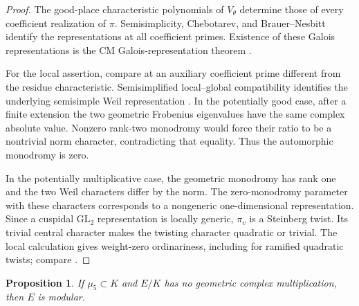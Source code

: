 \documentclass[11pt,a4paper]{article}
\newtheorem{proposition}[theorem]{Proposition}
\numberwithin{equation}{section}
\begin{document}
\begin{proof}
The good-place characteristic polynomials of \(V_\theta\) determine those of every coefficient realization of \(\pi\). Semisimplicity, Chebotarev, and Brauer--Nesbitt identify the representations at all coefficient primes. Existence of these Galois representations is the CM Galois-representation theorem \cite{HLTT}.

For the local assertion, compare at an auxiliary coefficient prime different from the residue characteristic. Semisimplified local--global compatibility identifies the underlying semisimple Weil representation \cite{V}. In the potentially good case, after a finite extension the two geometric Frobenius eigenvalues have the same complex absolute value. Nonzero rank-two monodromy would force their ratio to be a nontrivial norm character, contradicting that equality. Thus the automorphic monodromy is zero.

In the potentially multiplicative case, the geometric monodromy has rank one and the two Weil characters differ by the norm. The zero-monodromy parameter with these characters corresponds to a nongeneric one-dimensional representation. Since a cuspidal \(\mathrm{GL}_2\) representation is locally generic, \(\pi_v\) is a Steinberg twist. Its trivial central character makes the twisting character quadratic or trivial. The local calculation \cite[Lemma~9.2(ii)]{O} gives weight-zero ordinariness, including for ramified quadratic twists; compare \cite[Lemma~6.1.3(4)]{CN}.
\end{proof}

\begin{proposition}\label{prop:6.2}
If \(\mu_5\subset K\) and \(E/K\) has no geometric complex multiplication, then \(E\) is modular.
\end{proposition}
\end{document}
